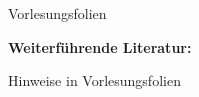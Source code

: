 \begin{course}
\begin{content}
\end{content}

\begin{media}Vorlesungsfolien

\end{media}

\begin{literature}\textbf{Weiterführende Literatur:}

 

Hinweise in Vorlesungsfolien

\end{literature}



\end{course}